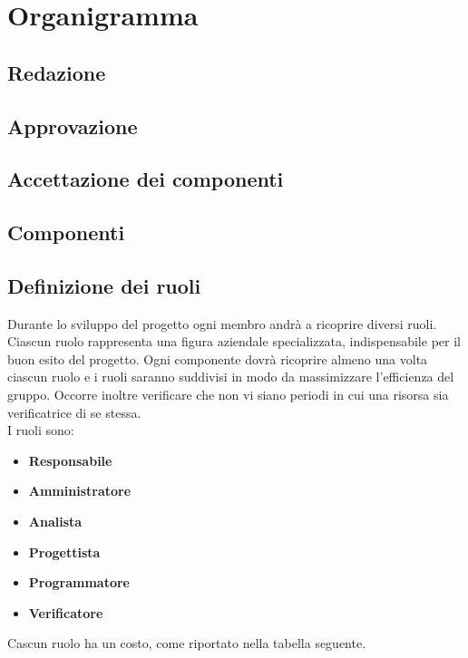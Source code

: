 \section{Organigramma}
	\subsection{Redazione}
	\subsection{Approvazione}
	\subsection{Accettazione dei componenti}
	\subsection{Componenti}
	\subsection{Definizione dei ruoli}
		Durante lo sviluppo del progetto ogni membro andrà a ricoprire diversi ruoli. Ciascun ruolo rappresenta una figura 		aziendale specializzata, indispensabile per il buon esito del progetto. Ogni componente dovrà ricoprire almeno una volta 		ciascun ruolo e i ruoli saranno suddivisi in modo da massimizzare l'efficienza del gruppo. Occorre inoltre verificare 		che non vi siano periodi in cui una risorsa sia verificatrice di se stessa. \\
		I ruoli sono:
		\begin{itemize}
			\item \textbf{Responsabile} \\
			\item \textbf{Amministratore} \\
			\item \textbf{Analista} \\
			\item \textbf{Progettista} \\
			\item \textbf{Programmatore} \\
			\item \textbf{Verificatore} \\
		\end{itemize}
		Cascun ruolo ha un costo, come riportato nella tabella seguente.